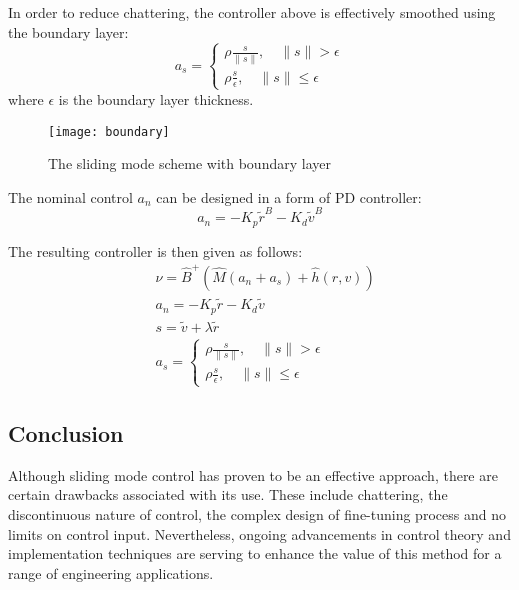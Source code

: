     In order to reduce chattering, the controller above is effectively smoothed using
    the boundary layer:
    \begin{equation}
    a_s = 
    \begin{cases}
    \rho \frac{s}{\|s\|}, \quad \|s\| >\epsilon\\
    \rho \frac{s}{\epsilon}, \quad \|s\| \leq\epsilon
    \end{cases}
    \end{equation}
    where $\epsilon$ is the boundary layer thickness.

    \begin{figure}[H]
        \centering\texttt{[image: boundary]}
        \caption{The sliding mode scheme with boundary layer}
        \label{image:boundary}
    \end{figure}

    The nominal control $a_n$ can be 
    designed in a form of PD controller:
    \begin{equation}
        a_n = - K_p\tilde{r}^B - K_d\tilde{v}^B
    \end{equation}

    The resulting controller is then given as follows:
    \begin{align} 
        &\nu = \hat{B}^{+}(\hat{M}(a_n + a_s) + \hat h(r, v))
        \label{eqn::sliding_mode} \\
        &a_n = - K_p\tilde{r} - K_d\tilde{v} \\
        &s = \tilde{v} + \lambda \tilde{r} \\
        &a_s = 
        \begin{cases}
        \rho \frac{s}{\|s\|}, \quad \|s\| >\epsilon\\
        \rho \frac{s}{\epsilon}, \quad \|s\| \leq\epsilon
        \end{cases}
    \end{align}

    \subsection{Conclusion}

    Although sliding mode control has proven to be an effective approach, 
    there are certain drawbacks associated with its use. These include 
    chattering, the discontinuous nature of control, the complex 
    design of fine-tuning process and no limits on control input. 
    Nevertheless, ongoing advancements in control theory and 
    implementation techniques are serving to enhance the value of this method 
    for a range of engineering applications.
    
